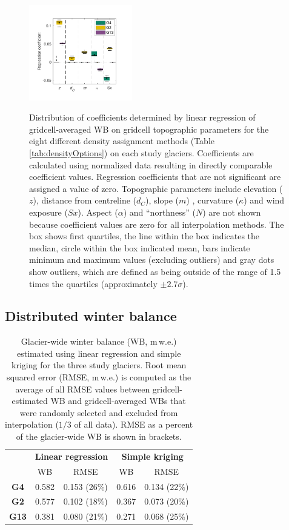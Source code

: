 \documentclass[twocolumn, letterpaper]{igs}
\begin{document}
\begin{figure}
	\centering
	\includegraphics[width =0.4\textwidth]{BetaCoeffs.pdf}\\
	\caption{Distribution of coefficients determined by linear regression of gridcell-averaged WB on gridcell topographic parameters for the eight different density assignment methods (Table \ref{tab:densityOptions}) on each study glaciers. Coefficients are calculated using normalized data resulting in directly comparable coefficient values. Regression coefficients that are not significant are assigned a value of zero. Topographic parameters include elevation ($z$), distance from centreline ($d_C$), slope ($m$) , curvature ($\kappa$) and wind exposure ($Sx$).  Aspect ($\alpha$) and ``northness'' ($N$) are not shown because coefficient values are zero for all interpolation methods. The box shows first quartiles, the line within the box indicates the median, circle within the box indicated mean, bars indicate minimum and maximum values (excluding outliers) and gray dots show outliers, which are defined as being outside of the range of 1.5 times the quartiles (approximately $\pm2.7\sigma$). }
	\label{fig:BetaCoeffs}
\end{figure}


\subsection{Distributed winter balance}
 
 \begin{table}[]
\centering
\caption{Glacier-wide winter balance (WB, m\,w.e.) estimated using linear regression and simple kriging for the three study glaciers. Root mean squared error (RMSE, m\,w.e.) is computed as the average of all RMSE values between gridcell-estimated WB and gridcell-averaged WBs that were randomly selected and excluded from interpolation ($1/3$ of all data). RMSE as a percent of the glacier-wide WB is shown in brackets.}
\label{tab:WSMB&RMSE}
\begin{tabular}{c|cc|cc}
 & \multicolumn{2}{c|}{\textbf{Linear regression}} & \multicolumn{2}{c}{\textbf{Simple kriging}} \\
 & WB & RMSE & WB & RMSE \\ \hline
\textbf{G4} & 0.582 & 0.153 (26\%) & 0.616 & 0.134 (22\%) \\
\textbf{G2} & 0.577 & 0.102 (18\%) & 0.367 & 0.073 (20\%) \\
\textbf{G13} & 0.381 & 0.080 (21\%) & 0.271 & 0.068 (25\%)
\end{tabular}
\end{table}
\end{document}

